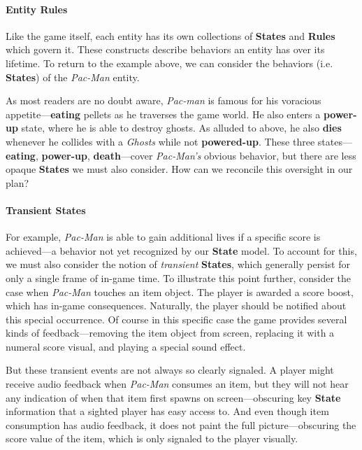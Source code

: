 \documentclass{report}
\newcommand{\state}[1]{\textbf{#1}}
\newcommand{\rules}{\textbf{Rules}\xspace}
\begin{document}
\paragraph{\state{Entity} \state{Rules}}
Like the game itself, each entity has its own collections of \state{States} and \rules which govern it. These constructs describe behaviors an entity has over its lifetime. To return to the example above, we can consider the behaviors (i.e. \state{States}) of the \emph{Pac-Man} entity.  

As most readers are no doubt aware, \emph{Pac-man} is famous for his voracious appetite---\state{eating} pellets as he traverses the game world. He also enters a \state{power-up} state, where he is able to destroy ghosts. As alluded to above, he also \state{dies} whenever he collides with a \emph{Ghosts} while not \state{powered-up}. These three states---\state{eating}, \state{power-up}, \state{death}---cover \emph{Pac-Man's} obvious behavior, but there are less opaque \state{States} we must also consider. How can we reconcile this oversight in our plan? 

\paragraph{Transient States}

For example, \emph{Pac-Man} is able to gain additional lives if a specific score is achieved---a behavior not yet recognized by our \state{State} model. To account for this, we must also consider the notion of \emph{transient} \state{States}, which generally persist for only a single frame of in-game time. To illustrate this point further, consider the case when \emph{Pac-Man} touches an item object. The player is awarded a score boost, which has in-game consequences. Naturally, the player should be notified about this special occurrence. Of course in this specific case the game provides several kinds of feedback---removing the item object from screen, replacing it with a numeral score visual, and playing a special sound effect. 

But these transient events are not always so clearly signaled. A player might receive audio feedback when \emph{Pac-Man} consumes an item, but they will not hear any indication of when that item first spawns on screen---obscuring key \state{State} information that a sighted player has easy access to. And even though item consumption has audio feedback, it does not paint the full picture---obscuring the score value of the item, which is only signaled to the player visually. 
\end{document}
